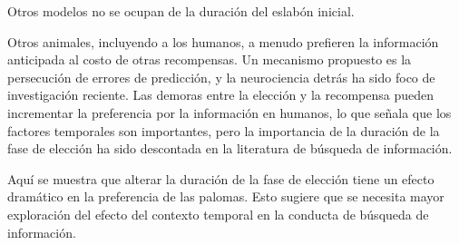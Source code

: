 \documentclass[a4paper,12pt]{article}
\begin{document}
Otros modelos no se ocupan de la duración del eslabón inicial.

Otros animales, incluyendo a los humanos, a menudo prefieren la información anticipada al costo de otras recompensas.
Un mecanismo propuesto es la persecución de errores de predicción, y la neurociencia detrás ha sido foco de investigación reciente.
Las demoras entre la elección y la recompensa pueden incrementar la preferencia por la información en humanos, lo que señala que los factores temporales son importantes, pero la importancia de la duración de la fase de elección ha sido descontada en la literatura de búsqueda de información.

Aquí se muestra que alterar la duración de la fase de elección tiene un efecto dramático en la preferencia de las palomas.
Esto sugiere que se necesita mayor exploración del efecto del contexto temporal en la conducta de búsqueda de información.
\end{document}

